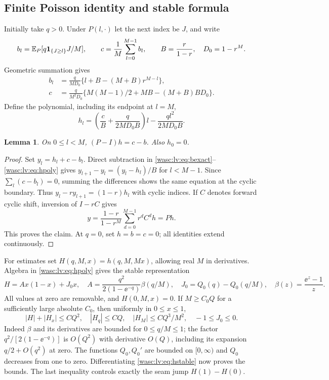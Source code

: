 \documentclass[11pt,a4paper]{article}
\newtheorem{lemma}[theorem]{Lemma}
\theoremstyle{remark}\newtheorem{remark}[theorem]{Remark}
\newcommand{\ind}{\mathbf 1}\newcommand{\wasc}{\operatorname{wasc}}\newcommand{\dasc}{\operatorname{dasc}}
\numberwithin{equation}{section}
\begin{document}
\subsection{Finite Poisson identity and stable formula}
Initially take $q>0$. Under $P(l,\cdot)$ let the next index be $J$, and write
\[
b_l=\E_P[q\ind_{\{J\ge l\}}J/M],\qquad c=\frac1M\sum_{l=0}^{M-1}b_l,
\qquad B=\frac r{1-r},\quad D_0=1-r^M.
\]
Geometric summation gives
\begin{align}
b_l&=\frac q{MD_0}\{l+B-(M+B)r^{M-l}\},\label{wasc:lv:eq:bexact}\\
c&=\frac q{M^2D_0}\{M(M-1)/2+MB-(M+B)BD_0\}.\label{wasc:lv:eq:cexact}
\end{align}
Define the polynomial, including its endpoint at $l=M$,
\begin{equation}\label{wasc:lv:eq:hpoly}
h_l=\left(\frac cB+\frac q{2MD_0B}\right)l-\frac{q l^2}{2MD_0B}.
\end{equation}
\begin{lemma}\label{wasc:lv:lem:poisson}
On $0\le l<M$, $(P-I)h=c-b$. Also $h_0=0$.
\end{lemma}
\begin{proof}
Set $y_l=h_l+c-b_l$. Direct subtraction in \eqref{wasc:lv:eq:bexact}--\eqref{wasc:lv:eq:hpoly} gives
$y_{l+1}-y_l=(y_l-h_l)/B$ for $l<M-1$. Since $\sum_l(c-b_l)=0$, summing the differences shows the same equation at the cyclic boundary. Thus
$y_l-r y_{l+1}=(1-r)h_l$ with cyclic indices. If $C$ denotes forward cyclic shift, inversion of $I-rC$ gives
\[
y=\frac{1-r}{1-r^M}\sum_{d=0}^{M-1}r^d C^d h=Ph.
\]
This proves the claim. At $q=0$, set $h=b=c=0$; all identities extend continuously.
\end{proof}
For estimates set $H(q,M,x)=h(q,M,Mx)$, allowing real $M$ in derivatives. Algebra in \eqref{wasc:lv:eq:hpoly} gives the stable representation
\begin{equation}\label{wasc:lv:eq:hstable}
H=A x(1-x)+J_0x,\quad
A=\frac{q^2}{2(1-\ee^{-q})}\beta(q/M),\quad
J_0=Q_0(q)-Q_0(q/M),\quad\beta(z)=\frac{\ee^z-1}{z}.
\end{equation}
All values at zero are removable, and $H(0,M,x)=0$. If $M\ge C_0Q$ for a sufficiently large absolute $C_0$, then uniformly in $0\le x\le1$,
\begin{equation}\label{wasc:lv:eq:hderiv}
|H|+|H_x|\le CQ^2,\quad |H_q|\le CQ,\quad
|H_M|\le CQ^3/M^2,\quad -1\le J_0\le0.
\end{equation}
Indeed $\beta$ and its derivatives are bounded for $0\le q/M\le1$; the factor
$q^2/[2(1-\ee^{-q})]$ is $O(Q^2)$ with derivative $O(Q)$, including its expansion $q/2+O(q^2)$ at zero. The functions $Q_0,Q_0'$ are bounded on $[0,\infty)$ and $Q_0$ decreases from one to zero. Differentiating \eqref{wasc:lv:eq:hstable} now proves the bounds. The last inequality controls exactly the seam jump $H(1)-H(0)$.
\end{document}
